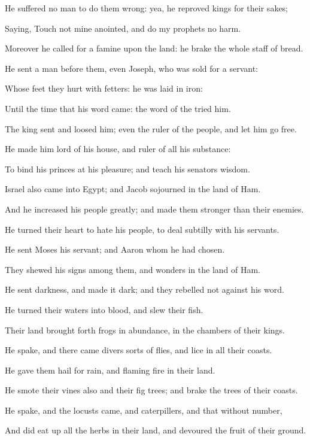 \verse He suffered no man to do them wrong: yea, he reproved kings for their sakes;

\verse Saying, Touch not mine anointed, and do my prophets no harm.

\verse Moreover he called for a famine upon the land: he brake the whole staff of bread.

\verse He sent a man before them, even Joseph, who was sold for a servant:

\verse Whose feet they hurt with fetters: he was laid in iron:

\verse Until the time that his word came: the word of the \LORD tried him.

\verse The king sent and loosed him; even the ruler of the people, and let him go free.

\verse He made him lord of his house, and ruler of all his substance:

\verse To bind his princes at his pleasure; and teach his senators wisdom.

\verse Israel also came into Egypt; and Jacob sojourned in the land of Ham.

\verse And he increased his people greatly; and made them stronger than their enemies.

\verse He turned their heart to hate his people, to deal subtilly with his servants.

\verse He sent Moses his servant; and Aaron whom he had chosen.

\verse They shewed his signs among them, and wonders in the land of Ham.

\verse He sent darkness, and made it dark; and they rebelled not against his word.

\verse He turned their waters into blood, and slew their fish.

\verse Their land brought forth frogs in abundance, in the chambers of their kings.

\verse He spake, and there came divers sorts of flies, and lice in all their coasts.

\verse He gave them hail for rain, and flaming fire in their land.

\verse He smote their vines also and their fig trees; and brake the trees of their coasts.

\verse He spake, and the locusts came, and caterpillers, and that without number,

\verse And did eat up all the herbs in their land, and devoured the fruit of their ground.

